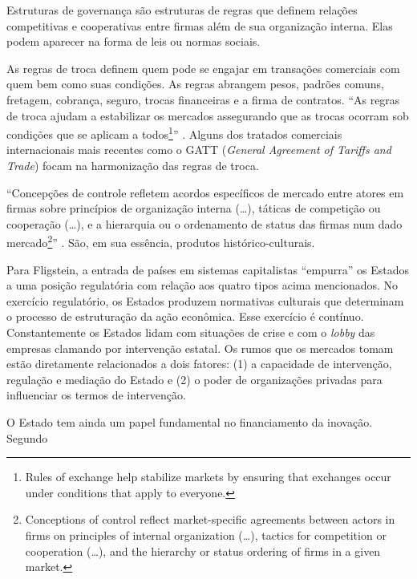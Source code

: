 \documentclass[a4paper, 12pt, openright, oneside, german, french, english, brazil]{abntex2}
\begin{document}
	Estruturas de governança são estruturas de regras que definem relações competitivas e cooperativas entre firmas além de sua organização interna. Elas podem aparecer na forma de leis ou normas sociais.
	
	As regras de troca definem quem pode se engajar em transações comerciais com quem bem como suas condições. As regras abrangem pesos, padrões comuns, fretagem, cobrança, seguro, trocas financeiras e a firma de contratos. ``As regras de troca ajudam a estabilizar os mercados assegurando que as trocas ocorram sob condições que se aplicam a todos\footnote{Rules of exchange help stabilize markets by ensuring that exchanges occur under conditions that apply to everyone.}'' \cite[p. 35]{fligstein2002architecture}. Alguns dos tratados comerciais internacionais mais recentes como o GATT (\textit{General Agreement of Tariffs and Trade}) focam na harmonização das regras de troca.
	
	``Concepções de controle refletem acordos específicos de mercado entre atores em firmas sobre princípios de organização interna (\dots), táticas de competição ou cooperação (\dots), e a hierarquia ou o ordenamento de status das firmas num dado mercado\footnote{Conceptions of control reflect market-specific agreements between actors in firms on principles of internal organization (\dots), tactics for competition or cooperation (\dots), and the hierarchy or status ordering of firms in a given market.}'' \cite[p. 35]{fligstein2002architecture}. São, em sua essência, produtos histórico-culturais.
	
	Para Fligstein, a entrada de países em sistemas capitalistas ``empurra'' os Estados a uma posição regulatória com relação aos quatro tipos acima mencionados. No exercício regulatório, os Estados produzem normativas culturais que determinam o processo de estruturação da ação econômica. Esse exercício é contínuo. Constantemente os Estados lidam com situações de crise e com o \textit{lobby} das empresas clamando por intervenção estatal. Os rumos que os mercados tomam estão diretamente relacionados a dois fatores: (1) a capacidade de intervenção, regulação e mediação do Estado e (2) o poder de organizações privadas para influenciar os termos de intervenção.
	
	O Estado tem ainda um papel fundamental no financiamento da inovação. Segundo 
	
\end{document}
